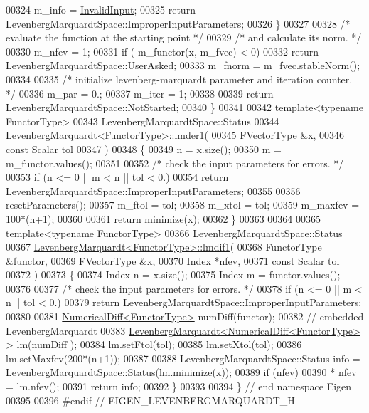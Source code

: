 \begin{DoxyCode}
00324               m\_info = \hyperlink{group__enums_gga85fad7b87587764e5cf6b513a9e0ee5ea945604f62795ffc70aedf2bd12ea0434}{InvalidInput};
00325               \textcolor{keywordflow}{return} LevenbergMarquardtSpace::ImproperInputParameters;
00326             \}
00327 
00328     \textcolor{comment}{/*     evaluate the function at the starting point */}
00329     \textcolor{comment}{/*     and calculate its norm. */}
00330     m\_nfev = 1;
00331     \textcolor{keywordflow}{if} ( m\_functor(x, m\_fvec) < 0)
00332         \textcolor{keywordflow}{return} LevenbergMarquardtSpace::UserAsked;
00333     m\_fnorm = m\_fvec.stableNorm();
00334 
00335     \textcolor{comment}{/*     initialize levenberg-marquardt parameter and iteration counter. */}
00336     m\_par = 0.;
00337     m\_iter = 1;
00338 
00339     \textcolor{keywordflow}{return} LevenbergMarquardtSpace::NotStarted;
00340 \}
00341 
00342 \textcolor{keyword}{template}<\textcolor{keyword}{typename} FunctorType>
00343 LevenbergMarquardtSpace::Status
00344 \hyperlink{class_eigen_1_1_levenberg_marquardt}{LevenbergMarquardt<FunctorType>::lmder1}(
00345         FVectorType  &x,
00346         \textcolor{keyword}{const} Scalar tol
00347         )
00348 \{
00349     n = x.size();
00350     m = m\_functor.values();
00351 
00352     \textcolor{comment}{/* check the input parameters for errors. */}
00353     \textcolor{keywordflow}{if} (n <= 0 || m < n || tol < 0.)
00354         \textcolor{keywordflow}{return} LevenbergMarquardtSpace::ImproperInputParameters;
00355 
00356     resetParameters();
00357     m\_ftol = tol;
00358     m\_xtol = tol;
00359     m\_maxfev = 100*(n+1);
00360 
00361     \textcolor{keywordflow}{return} minimize(x);
00362 \}
00363 
00364 
00365 \textcolor{keyword}{template}<\textcolor{keyword}{typename} FunctorType>
00366 LevenbergMarquardtSpace::Status
00367 \hyperlink{class_eigen_1_1_levenberg_marquardt}{LevenbergMarquardt<FunctorType>::lmdif1}(
00368         FunctorType &functor,
00369         FVectorType  &x,
00370         Index *nfev,
00371         \textcolor{keyword}{const} Scalar tol
00372         )
00373 \{
00374     Index n = x.size();
00375     Index m = functor.values();
00376 
00377     \textcolor{comment}{/* check the input parameters for errors. */}
00378     \textcolor{keywordflow}{if} (n <= 0 || m < n || tol < 0.)
00379         \textcolor{keywordflow}{return} LevenbergMarquardtSpace::ImproperInputParameters;
00380 
00381     \hyperlink{class_eigen_1_1_numerical_diff}{NumericalDiff<FunctorType>} numDiff(functor);
00382     \textcolor{comment}{// embedded LevenbergMarquardt}
00383     \hyperlink{class_eigen_1_1_levenberg_marquardt}{LevenbergMarquardt<NumericalDiff<FunctorType>} > lm(numDiff
      );
00384     lm.setFtol(tol);
00385     lm.setXtol(tol);
00386     lm.setMaxfev(200*(n+1));
00387 
00388     LevenbergMarquardtSpace::Status info = LevenbergMarquardtSpace::Status(lm.minimize(x));
00389     \textcolor{keywordflow}{if} (nfev)
00390         * nfev = lm.nfev();
00391     \textcolor{keywordflow}{return} info;
00392 \}
00393 
00394 \} \textcolor{comment}{// end namespace Eigen}
00395 
00396 \textcolor{preprocessor}{#endif // EIGEN\_LEVENBERGMARQUARDT\_H}
\end{DoxyCode}
